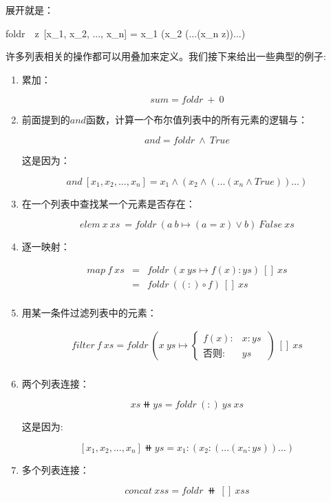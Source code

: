 \documentclass{article}
\begin{document}
展开就是：

\be
foldr\ \oplus\ z\ [x_1, x_2, ..., x_n] = x_1 \oplus (x_2 \oplus (...(x_n \oplus z))...)
\ee

许多列表相关的操作都可以用叠加来定义。我们接下来给出一些典型的例子:

\begin{enumerate}
\item 累加：

\[
sum = foldr\ +\ 0
\]

\item 前面提到的$and$函数，计算一个布尔值列表中的所有元素的逻辑与：

\[
and = foldr\ \land\ True
\]

这是因为：

\[
and\ [x_1, x_2, ..., x_n] = x_1 \land (x_2 \land (...(x_n \land True))...)
\]

\item 在一个列表中查找某一个元素是否存在：

\[
elem\ x\ xs\ = foldr\ (a\ b \mapsto (a = x) \lor b)\ False\ xs
\]

\item 逐一映射：

\[
\begin{array}{rcl}
map\ f\ xs & = & foldr\ (x\ ys \mapsto f(x) : ys)\ []\ xs \\
           & = & foldr\ ((:) \circ f)\ []\ xs \\
\end{array}
\]

\item 用某一条件过滤列表中的元素：

\[
\begin{array}{rl}
filter\ f\ xs = foldr\ (x\ ys \mapsto
  \begin{cases}
    f(x): & x:ys\ \\
    \text{否则}: & ys
  \end{cases})\ []\ xs \\
\end{array}
\]

\item 两个列表连接：

\[
xs \doubleplus ys = foldr\ (:)\ ys\ xs
\label{eq:binary-concat}
\]

这是因为:

\[
[x_1, x_2, ..., x_n] \doubleplus ys = x_1 : (x_2 : (...(x_n : ys))...)
\]

\item 多个列表连接：

\[
concat\ xss = foldr\ \doubleplus\ []\ xss
\]

\end{enumerate}
\end{document}
